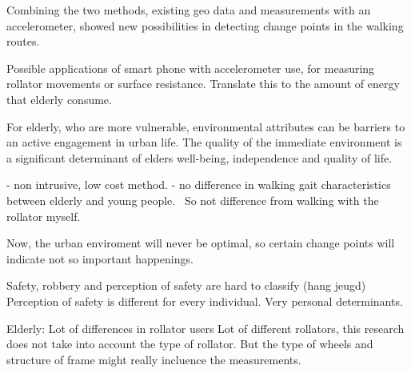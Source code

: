 Combining the two methods, existing geo data and measurements with an accelerometer, showed new possibilities in detecting change points in the walking routes. 








Possible  applications of smart phone with accelerometer use, for measuring rollator movements or surface resistance. Translate this to the amount of energy that elderly consume. 









For elderly, who are more vulnerable, environmental attributes can be barriers to an active engagement in urban life. The quality of the immediate environment is a significant determinant of elders well-being, independence and quality of life.

- non intrusive, low cost method. 
- no difference in walking gait characteristics between elderly and young people.~\cite{Wang2015} So not difference from walking with the rollator myself. 




Now, the urban enviroment will never be optimal, so certain change points will indicate not so important happenings. 



Safety, robbery and perception of safety are hard to classify  (hang jeugd)
Perception of safety is different for every individual. Very personal determinants. 
 

Elderly:
Lot of differences in rollator users
Lot of different rollators, this research does not take into account the type of rollator. But the type of wheels and structure of frame might really incluence the measurements. 